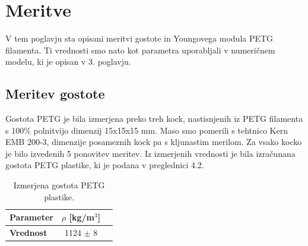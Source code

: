 \documentclass[12pt]{report}
\begin{document}
\section{Meritve}
V tem poglavju sta opisani meritvi gostote in Youngovega modula PETG filamenta. Ti vrednosti smo nato kot parametra uporabljali v numeričnem modelu, ki
je opisan v 3. poglavju. 

\subsection{Meritev gostote}
Gostota PETG je bila izmerjena preko treh kock, nastisnjenih iz PETG filamenta s 100\% polnitvijo dimenzij 15x15x15 mm. Maso smo pomerili s tehtnico Kern EMB 200-3, dimenzije posameznih
kock pa s kljunastim merilom. Za vsako kocko je bilo izvedenih 5 ponovitev meritev. Iz izmerjenih vrednosti je bila izračunana gostota PETG plastike, ki je podana v preglednici 4.2.

\begin{table}[H]
  \caption{Izmerjena gostota PETG plastike.}
  \centering
  \begin{tabular}{ | l | c | r | }
    \hline
    \textbf{Parameter} & $\rho$ [kg/m$^3$] \\ \hline
    \textbf{Vrednost} & 1124 $\pm$ 8 \\
    \hline  
  \end{tabular}
\end{table}
\end{document}
